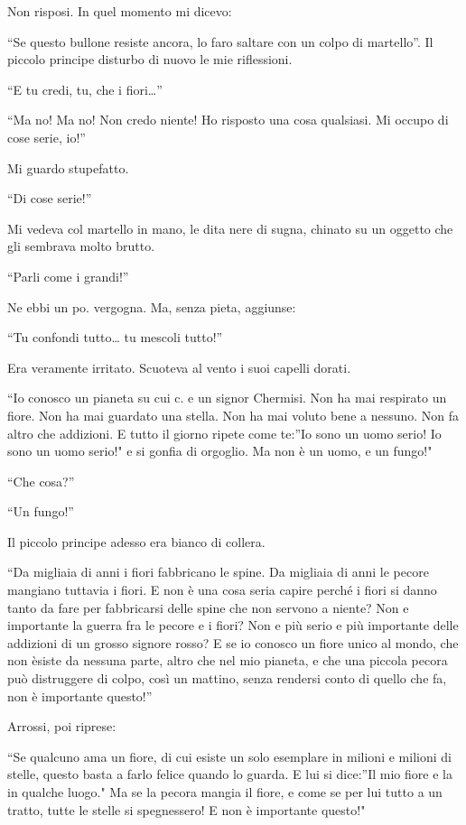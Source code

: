 \documentclass[11pt]{scrbook}
\begin{document}
Non risposi. In quel momento mi dicevo:

``Se questo bullone resiste ancora, lo faro saltare con un colpo di
martello''. Il piccolo principe disturbo di nuovo le mie riflessioni.

``E tu credi, tu, che i fiori\ldots{}''

``Ma no! Ma no! Non credo niente! Ho risposto una cosa qualsiasi. Mi
occupo di cose serie, io!''

Mi guardo stupefatto.

``Di cose serie!''

Mi vedeva col martello in mano, le dita nere di sugna, chinato su un
oggetto che gli sembrava molto brutto.

``Parli come i grandi!''

Ne ebbi un po. vergogna. Ma, senza pieta, aggiunse:

``Tu confondi tutto\ldots{} tu mescoli tutto!''

Era veramente irritato. Scuoteva al vento i suoi capelli dorati.

``Io conosco un pianeta su cui c. e un signor Chermisi. Non ha mai
respirato un fiore. Non ha mai guardato una stella. Non ha mai voluto
bene a nessuno. Non fa altro che addizioni. E tutto il giorno ripete
come te:''Io sono un uomo serio! Io sono un uomo serio!" e si gonfia di
orgoglio. Ma non è un uomo, e un fungo!"

``Che cosa?''

``Un fungo!''

Il piccolo principe adesso era bianco di collera.

``Da migliaia di anni i fiori fabbricano le spine. Da migliaia di anni
le pecore mangiano tuttavia i fiori. E non è una cosa seria capire
perché i fiori si danno tanto da fare per fabbricarsi delle spine che
non servono a niente? Non e importante la guerra fra le pecore e i
fiori? Non e più serio e più importante delle addizioni di un grosso
signore rosso? E se io conosco un fiore unico al mondo, che non èsiste
da nessuna parte, altro che nel mio pianeta, e che una piccola pecora
può distruggere di colpo, così un mattino, senza rendersi conto di
quello che fa, non è importante questo!''

Arrossi, poi riprese:

``Se qualcuno ama un fiore, di cui esiste un solo esemplare in milioni e
milioni di stelle, questo basta a farlo felice quando lo guarda. E lui
si dice:''Il mio fiore e la in qualche luogo." Ma se la pecora mangia il
fiore, e come se per lui tutto a un tratto, tutte le stelle si
spegnessero! E non è importante questo!"
\end{document}
